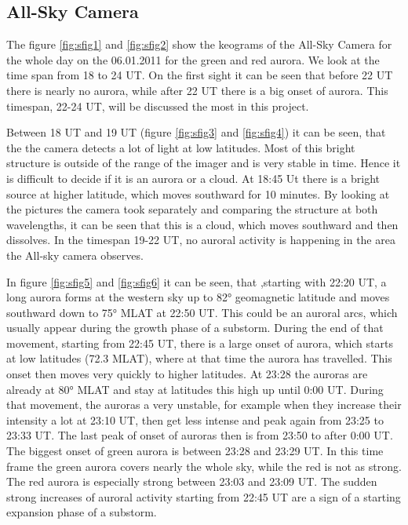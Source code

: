 \documentclass[10pt,a4paper]{article}
\begin{document}
\subsection{All-Sky Camera}

The figure \ref{fig:sfig1} and \ref{fig:sfig2} show the keograms of the All-Sky Camera for the whole day on the 06.01.2011 for the green and red aurora. We look at the time span from 18 to 24 UT. On the first sight it can be seen that before 22 UT there is nearly no aurora, while after 22 UT there is a big onset of aurora. This timespan, 22-24 UT, will be discussed the most in this project.

Between 18 UT and 19 UT (figure \ref{fig:sfig3} and \ref{fig:sfig4}) it can be seen, that the the camera detects a lot of light at low latitudes. Most of this bright structure is outside of the range of the imager and is very stable in time. Hence it is difficult to decide if it is an aurora or a cloud. At 18:45 Ut there is a bright source at higher latitude, which moves southward for 10 minutes. By looking at the pictures the camera took separately and comparing the structure at both wavelengths, it can be seen that this is a cloud, which moves southward and then dissolves. 
In the timespan 19-22 UT, no auroral activity is happening in the area the All-sky camera observes.

 In figure \ref{fig:sfig5} and \ref{fig:sfig6} it can be seen, that ,starting with 22:20 UT, a long aurora forms at the western sky up to 82° geomagnetic latitude and moves southward down to 75° MLAT at 22:50 UT. This could be an auroral arcs, which usually appear during the growth phase of a substorm. During the end of that movement, starting from 22:45 UT, there is a large onset of aurora, which starts at low latitudes (72.3 MLAT), where at that time the aurora has travelled. This onset then moves very quickly to higher latitudes. At 23:28 the auroras are already at 80° MLAT and stay at latitudes this high up until 0:00 UT. During that movement, the auroras a very unstable, for example when they increase their intensity a lot at 23:10 UT, then get less intense and peak again from 23:25 to 23:33 UT. The last peak of onset of auroras then is from 23:50 to after 0:00 UT.
The biggest onset of green aurora is between 23:28 and 23:29 UT. In this time frame the green aurora covers nearly the whole sky, while the red is not as strong. The red aurora is especially strong between 23:03 and 23:09 UT.
The sudden strong increases of auroral activity starting from 22:45 UT are a sign of a starting expansion phase of a substorm.
\end{document}
